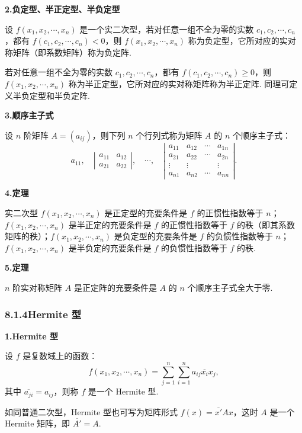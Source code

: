 \documentclass[UTF8, 12pt, fontset=fandol, oneside]{ctexart}
\begin{document}
\noindent\textbf{2.\quad 负定型、半正定型、半负定型}

设 $f(x_1,x_2,\cdots,x_n)$ 是一个实二次型，若对任意一组不全为零的实数 $c_1,c_2,\cdots,c_n$，都有 $f(c_1,c_2,\cdots,c_n)<0$，则 $f(x_1,x_2,\cdots,x_n)$ 称为负定型，它所对应的实对称矩阵（即系数矩阵）称为负定阵.

若对任意一组不全为零的实数 $c_1,c_2,\cdots,c_n$，都有 $f(c_1,c_2,\cdots,c_n)\ge 0$，则 $f(x_1,x_2,\cdots,x_n)$ 称为半正定型，它所对应的实对称矩阵称为半正定阵. 同理可定义半负定型和半负定阵.

\noindent\textbf{3.\quad 顺序主子式}

设 $n$ 阶矩阵 $A=(a_{ij})$，则下列 $n$ 个行列式称为矩阵 $A$ 的 $n$ 个顺序主子式：
\[
a_{11},\quad
\left|\begin{array}{cc}
a_{11} & a_{12}\\
a_{21} & a_{22}
\end{array}\right|,\quad
\cdots,\quad
\left|\begin{array}{cccc}
a_{11} & a_{12} & \cdots & a_{1n}\\
a_{21} & a_{22} & \cdots & a_{2n}\\
\vdots & \vdots &        & \vdots\\
a_{n1} & a_{n2} & \cdots & a_{nn}
\end{array}\right|.
\]

\noindent\textbf{4.\quad 定理}

实二次型 $f(x_1,x_2,\cdots,x_n)$ 是正定型的充要条件是 $f$ 的正惯性指数等于 $n$；$f(x_1,x_2,\cdots,x_n)$ 是半正定的充要条件是 $f$ 的正惯性指数等于 $f$ 的秩（即其系数矩阵的秩）；$f(x_1,x_2,\cdots,x_n)$ 是负定型的充要条件是 $f$ 的负惯性指数等于 $n$；$f(x_1,x_2,\cdots,x_n)$ 是半负定的充要条件是 $f$ 的负惯性指数等于 $f$ 的秩.

\noindent\textbf{5.\quad 定理}

$n$ 阶实对称矩阵 $A$ 是正定阵的充要条件是 $A$ 的 $n$ 个顺序主子式全大于零.

\subsubsection*{8.1.4\quad Hermite 型}

\noindent\textbf{1.\quad Hermite 型}

设 $f$ 是复数域上的函数：
\[
f(x_1,x_2,\cdots,x_n)=\sum_{j=1}^n\sum_{i=1}^n a_{ij}\overline{x_i}x_j,
\]
其中 $\overline{a_{ji}}=a_{ij}$，则称 $f$ 是一个 Hermite 型.

如同普通二次型，Hermite 型也可写为矩阵形式 $f(x)=\overline{x'}Ax$，这时 $A$ 是一个 Hermite 矩阵，即 $\overline{A'}=A$.
\end{document}
